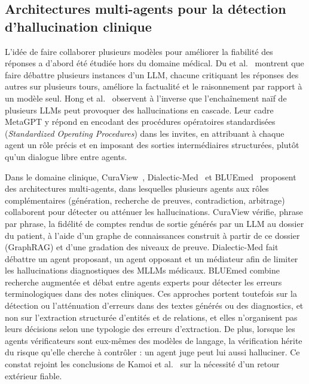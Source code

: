\subsection{Architectures multi-agents pour la détection d'hallucination clinique}

L'idée de faire collaborer plusieurs modèles pour améliorer la fiabilité des réponses a d'abord été étudiée hors du domaine médical. Du et al.~\cite{du2024debate} montrent que faire débattre plusieurs instances d'un LLM, chacune critiquant les réponses des autres sur plusieurs tours, améliore la factualité et le raisonnement par rapport à un modèle seul. Hong et al.~\cite{hong2024metagpt} observent à l'inverse que l'enchaînement naïf de plusieurs LLMs peut provoquer des hallucinations en cascade. Leur cadre MetaGPT y répond en encodant des procédures opératoires standardisées (\textit{Standardized Operating Procedures}) dans les invites, en attribuant à chaque agent un rôle précis et en imposant des sorties intermédiaires structurées, plutôt qu'un dialogue libre entre agents.

Dans le domaine clinique, CuraView~\cite{ye2026curaview}, Dialectic-Med~\cite{lu2026dialectic} et BLUEmed~\cite{you2026bluemed} proposent des architectures multi-agents, dans lesquelles plusieurs agents aux rôles complémentaires (génération, recherche de preuves, contradiction, arbitrage) collaborent pour détecter ou atténuer les hallucinations. CuraView vérifie, phrase par phrase, la fidélité de comptes rendus de sortie générés par un LLM au dossier du patient, à l'aide d'un graphe de connaissances construit à partir de ce dossier (GraphRAG) et d'une gradation des niveaux de preuve. Dialectic-Med fait débattre un agent proposant, un agent opposant et un médiateur afin de limiter les hallucinations diagnostiques des MLLMs médicaux. BLUEmed combine recherche augmentée et débat entre agents experts pour détecter les erreurs terminologiques dans des notes cliniques. Ces approches portent toutefois sur la détection ou l'atténuation d'erreurs dans des textes générés ou des diagnostics, et non sur l'extraction structurée d'entités et de relations, et elles n'organisent pas leurs décisions selon une typologie des erreurs d'extraction. De plus, lorsque les agents vérificateurs sont eux-mêmes des modèles de langage, la vérification hérite du risque qu'elle cherche à contrôler : un agent juge peut lui aussi halluciner. Ce constat rejoint les conclusions de Kamoi et al.~\cite{kamoi2024selfcorrection} sur la nécessité d'un retour extérieur fiable.

